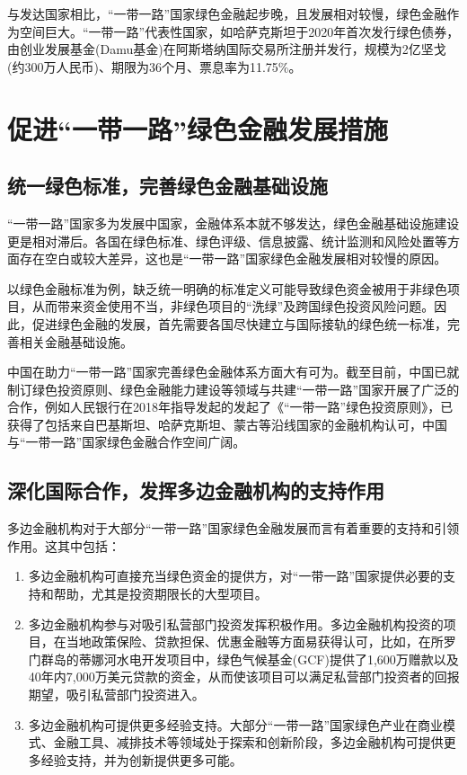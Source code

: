 \documentclass[a4paper,12pt]{ctexart}
\begin{document}
与发达国家相比，“一带一路”国家绿色金融起步晚，且发展相对较慢，绿色金融作为空间巨大。“一带一路”代表性国家，如哈萨克斯坦于2020年首次发行绿色债券，由创业发展基金(Damu基金)在阿斯塔纳国际交易所注册并发行，规模为2亿坚戈(约300万人民币)、期限为36个月、票息率为11.75\%。

\section*{促进“一带一路”绿色金融发展措施}
\subsection*{统一绿色标准，完善绿色金融基础设施}

“一带一路”国家多为发展中国家，金融体系本就不够发达，绿色金融基础设施建设更是相对滞后。各国在绿色标准、绿色评级、信息披露、统计监测和风险处置等方面存在空白或较大差异，这也是“一带一路”国家绿色金融发展相对较慢的原因。

以绿色金融标准为例，缺乏统一明确的标准定义可能导致绿色资金被用于非绿色项目，从而带来资金使用不当，非绿色项目的“洗绿”及跨国绿色投资风险问题。因此，促进绿色金融的发展，首先需要各国尽快建立与国际接轨的绿色统一标准，完善相关金融基础设施。

中国在助力“一带一路”国家完善绿色金融体系方面大有可为。截至目前，中国已就制订绿色投资原则、绿色金融能力建设等领域与共建“一带一路”国家开展了广泛的合作，例如人民银行在2018年指导发起的发起了《“一带一路”绿色投资原则》，已获得了包括来自巴基斯坦、哈萨克斯坦、蒙古等沿线国家的金融机构认可，中国与“一带一路”国家绿色金融合作空间广阔。

\subsection*{深化国际合作，发挥多边金融机构的支持作用}

多边金融机构对于大部分“一带一路”国家绿色金融发展而言有着重要的支持和引领作用。这其中包括：

\begin{enumerate}
    \item 多边金融机构可直接充当绿色资金的提供方，对“一带一路”国家提供必要的支持和帮助，尤其是投资期限长的大型项目。
    \item 多边金融机构参与对吸引私营部门投资发挥积极作用。多边金融机构投资的项目，在当地政策保险、贷款担保、优惠金融等方面易获得认可，比如，在所罗门群岛的蒂娜河水电开发项目中，绿色气候基金(GCF)提供了1,600万赠款以及40年内7,000万美元贷款的资金，从而使该项目可以满足私营部门投资者的回报期望，吸引私营部门投资进入。
    \item 多边金融机构可提供更多经验支持。大部分“一带一路”国家绿色产业在商业模式、金融工具、减排技术等领域处于探索和创新阶段，多边金融机构可提供更多经验支持，并为创新提供更多可能。
\end{enumerate}
\end{document}
